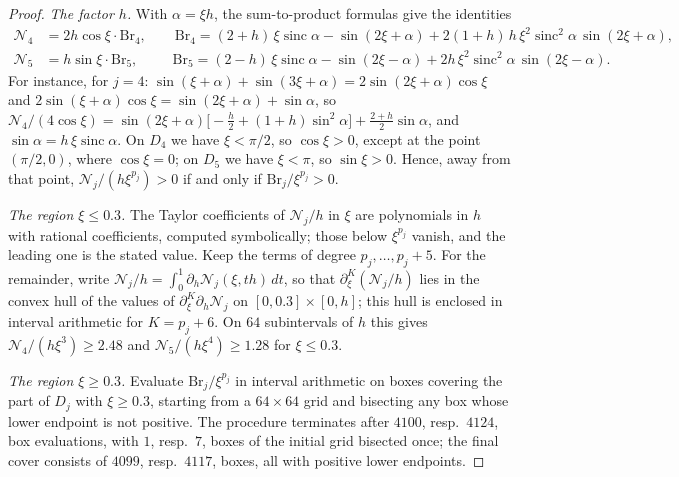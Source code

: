 \begin{proof}
\emph{The factor $h$.} With $\alpha=\xi h$, the sum-to-product formulas give the identities
\begin{align*}
\mathcal N_4&=2h\cos\xi\cdot\mathrm{Br}_4,\qquad \mathrm{Br}_4=(2+h)\,\xi\operatorname{sinc}\alpha-\sin(2\xi+\alpha)+2(1+h)\,h\,\xi^2\operatorname{sinc}^2\alpha\,\sin(2\xi+\alpha),\\
\mathcal N_5&=h\sin\xi\cdot\mathrm{Br}_5,\qquad\ \ \mathrm{Br}_5=(2-h)\,\xi\operatorname{sinc}\alpha-\sin(2\xi-\alpha)+2h\,\xi^2\operatorname{sinc}^2\alpha\,\sin(2\xi-\alpha).
\end{align*}
For instance, for $j=4$: $\sin(\xi+\alpha)+\sin(3\xi+\alpha)=2\sin(2\xi+\alpha)\cos\xi$ and
$2\sin(\xi+\alpha)\cos\xi=\sin(2\xi+\alpha)+\sin\alpha$, so $\mathcal N_4/(4\cos\xi)=\sin(2\xi+\alpha)\bigl[-\frac h2+(1+h)\sin^2\alpha\bigr]+\frac{2+h}2\sin\alpha$,
and $\sin\alpha=h\,\xi\operatorname{sinc}\alpha$. On $D_4$ we have $\xi<\pi/2$, so $\cos\xi>0$, except at the point $(\pi/2,0)$, where $\cos\xi=0$; on $D_5$ we have $\xi<\pi$,
so $\sin\xi>0$. Hence, away from that point, $\mathcal N_j/(h\xi^{p_j})>0$ if and only if $\mathrm{Br}_j/\xi^{p_j}>0$.

\emph{The region $\xi\le0.3$.} The Taylor coefficients of $\mathcal N_j/h$ in $\xi$ are polynomials in $h$ with rational
coefficients, computed symbolically; those below $\xi^{p_j}$ vanish, and the leading one is the stated value. Keep
the terms of degree $p_j,\dots,p_j+5$. For the remainder, write $\mathcal N_j/h=\int_0^1\partial_h\mathcal N_j(\xi,th)\,dt$, so that
$\partial_\xi^K(\mathcal N_j/h)$ lies in the convex hull of the values of $\partial_\xi^K\partial_h\mathcal N_j$ on $[0,0.3]\times[0,h]$; this hull is
enclosed in interval arithmetic for $K=p_j+6$. On $64$ subintervals of $h$ this gives $\mathcal N_4/(h\xi^3)\ge2.48$ and
$\mathcal N_5/(h\xi^4)\ge1.28$ for $\xi\le0.3$.

\emph{The region $\xi\ge0.3$.} Evaluate $\mathrm{Br}_j/\xi^{p_j}$ in interval arithmetic on boxes covering the part of $D_j$
with $\xi\ge0.3$, starting from a $64\times64$ grid and bisecting any box whose lower endpoint is not positive. The
procedure terminates after $4100$, resp.\ $4124$, box evaluations, with $1$, resp.\ $7$, boxes of the initial grid bisected once; the final cover
consists of $4099$, resp.\ $4117$, boxes, all with positive lower endpoints.
\end{proof}
